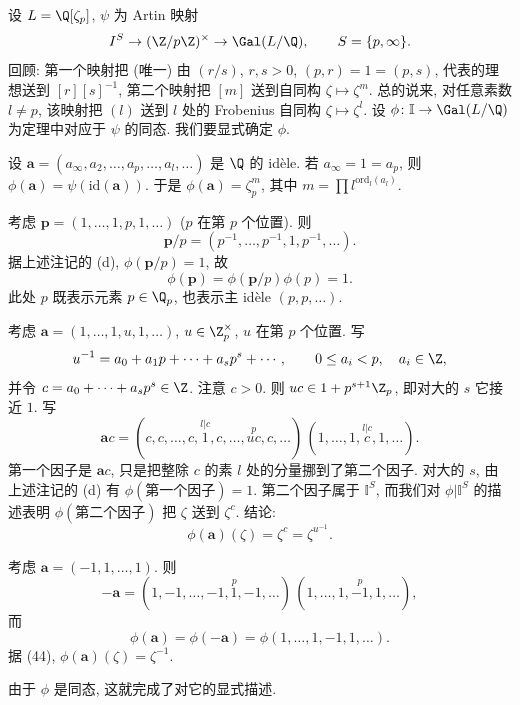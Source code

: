 \begin{example}\label{ex:v.4.10}
设 $L=\Q[\zeta_p]$, $\psi$ 为 Artin 映射
\[
I^S\to(\Z/p\Z)^{\times}\to\Gal(L/\Q),\qquad S=\{p,\infty\}.
\]
回顾: 第一个映射把 (唯一) 由 $(r/s)$, $r,s>0$, $(p,r)=1=(p,s)$, 代表的理想送到 $[r][s]^{-1}$, 第二个映射把 $[m]$ 送到自同构 $\zeta\mapsto\zeta^m$. 总的说来, 对任意素数 $l\ne p$, 该映射把 $(l)$ 送到 $l$ 处的 Frobenius 自同构 $\zeta\mapsto\zeta^l$. 设 $\phi\colon\mathbb{I}\to\Gal(L/\Q)$ 为定理中对应于 $\psi$ 的同态. 我们要显式确定 $\phi$.

设 $\mathbf{a}=(a_\infty,a_2,\ldots,a_p,\ldots,a_l,\ldots)$ 是 $\Q$ 的 idèle. 若 $a_\infty=1=a_p$, 则 $\phi(\mathbf{a})=\psi(\mathrm{id}(\mathbf{a}))$. 于是 $\phi(\mathbf{a})=\zeta_p^m$, 其中 $m=\prod l^{\mathrm{ord}_l(a_l)}$.

考虑 $\mathbf{p}=(1,\ldots,1,p,1,\ldots)$ ($p$ 在第 $p$ 个位置). 则
\[
\mathbf{p}/p=(p^{-1},\ldots,p^{-1},1,p^{-1},\ldots).
\]
据上述注记的 (d), $\phi(\mathbf{p}/p)=1$, 故
\[
\phi(\mathbf{p})=\phi(\mathbf{p}/p)\phi(p)=1.
\]
此处 $p$ 既表示元素 $p\in\Q_p$, 也表示主 idèle $(p,p,\ldots)$.

考虑 $\mathbf{a}=(1,\ldots,1,u,1,\ldots)$, $u\in\Z_p^{\times}$, $u$ 在第 $p$ 个位置. 写
\[
u^{-1}=a_0+a_1p+\cdots+a_sp^s+\cdots,\qquad 0\le a_i<p,\quad a_i\in\Z,
\]
并令 $c=a_0+\cdots+a_sp^s\in\Z$. 注意 $c>0$. 则 $uc\in 1+p^{s+1}\Z_p$, 即对大的 $s$ 它\guillemotleft 接近 $1$\guillemotright. 写
\[
\mathbf{a}c=(c,c,\ldots,c,\overset{l|c}{1},c,\ldots,\overset{p}{uc},c,\ldots)\,(1,\ldots,1,\overset{l|c}{c},1,\ldots).
\]
第一个因子是 $\mathbf{a}c$, 只是把整除 $c$ 的素 $l$ 处的分量挪到了第二个因子. 对大的 $s$, 由上述注记的 (d) 有 $\phi(\text{第一个因子})=1$. 第二个因子属于 $\mathbb{I}^S$, 而我们对 $\phi|\mathbb{I}^S$ 的描述表明 $\phi(\text{第二个因子})$ 把 $\zeta$ 送到 $\zeta^c$. 结论:
\begin{equation}
\phi(\mathbf{a})(\zeta)=\zeta^c=\zeta^{u^{-1}}.\tag{44}
\end{equation}

考虑 $\mathbf{a}=(-1,1,\ldots,1)$. 则
\[
-\mathbf{a}=(1,-1,\ldots,-1,\overset{p}{1},-1,\ldots)\,(1,\ldots,1,\overset{p}{-1},1,\ldots),
\]
而
\[
\phi(\mathbf{a})=\phi(-\mathbf{a})=\phi(1,\ldots,1,-1,1,\ldots).
\]
据 (44), $\phi(\mathbf{a})(\zeta)=\zeta^{-1}$.

由于 $\phi$ 是同态, 这就完成了对它的显式描述.
\end{example}

